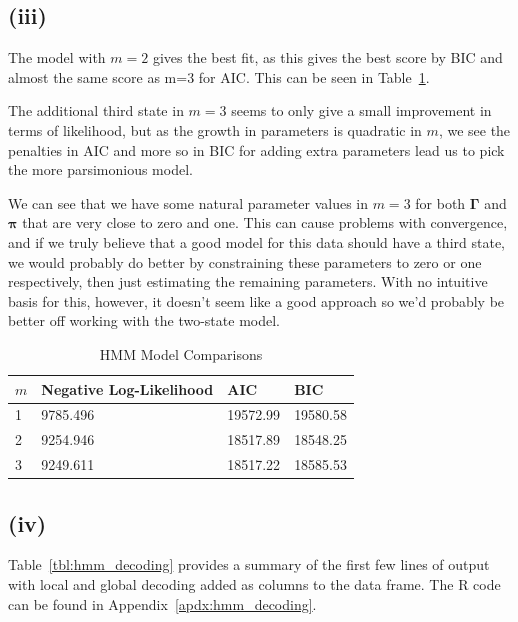 \documentclass{article}
\begin{document}
\subsection*{(iii)}


The model with $m = 2$ gives the best fit, as this gives the best score by
BIC and almost the same score as m=3 for AIC.  This can be seen in
Table~\ref{tbl:model_comparison}.

The additional third state in $m=3$ seems to only give a small
improvement in terms of likelihood, but as the growth in parameters is
quadratic in $m$, we see the penalties in AIC and more so in BIC for
adding extra parameters lead us to pick the more parsimonious model.

We can see that we have some natural parameter values in $m = 3$ for
both $\pmb{\Gamma}$ and $\pmb{\pi}$ that are very close to zero and
one. This can cause problems with convergence, and if we truly believe
that a good model for this data should have a third state, we would
probably do better by constraining these parameters to zero or one
respectively, then just estimating the remaining parameters. With no
intuitive basis for this, however, it doesn't seem like a good
approach so we'd probably be better off working with the two-state model.


\begin{table}[]
  \centering
  \begin{tabular}{l l l l}
    \toprule
    $m$ & Negative Log-Likelihood & AIC       & BIC      \\
    \midrule
    1   & 9785.496                & 19572.99  & 19580.58 \\
    2   & 9254.946                & 18517.89  & 18548.25 \\
    3   & 9249.611                & 18517.22  & 18585.53 \\
    \bottomrule
  \end{tabular}
  \caption{HMM Model Comparisons}\label{tbl:model_comparison}
\end{table}

\subsection*{(iv)}

Table~\ref{tbl:hmm_decoding} provides a summary of the first few lines
of output with local and global decoding added as columns to the data
frame. The R code can be found in Appendix~\ref{apdx:hmm_decoding}.
\end{document}
